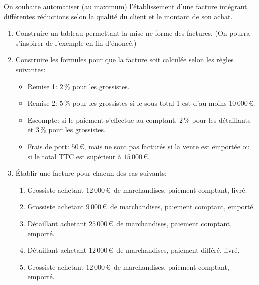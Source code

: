 \documentclass[a4paper, 9pt]{article}
\begin{document}
  \exost 
  On souhaite automatiser (au maximum) l'\'etablissement d'une facture int\'egrant diff\'erentes r\'eductions selon la qualit\'e du client et le montant de son achat.
  \begin{enumerate}
    \item Construire un tableau permettant la mise ne forme des factures. (On pourra s'inspirer de l'exemple en fin d'\'enonc\'e.)
    \item Construire les formules pour que la facture soit calcul\'ee selon les règles suivantes:
    \begin{itemize}
      \item Remise 1: $2$\,\% pour les grossistes.
      \item Remise 2: $5$\,\% pour les grossistes si le sous-total 1 est d'au moins $10\,000$\,\euro{}.
      \item Escompte: si le paiement s'effectue au comptant, $2$\,\% pour les d\'etaillants et $3$\,\% pour les grossistes.
      \item Frais de port: $50$\,\euro{}, mais ne sont pas factur\'es si la vente est emport\'ee ou si le total TTC est sup\'erieur à $15\,000$\,\euro{}.
    \end{itemize}
    \item Établir une facture pour chacun des cas suivants:
    \begin{enumerate}
      \item Grossiste achetant $12\,000$\,\euro{}\ de marchandises, paiement comptant, livr\'e.
      \item Grossiste achetant $9\,000$\,\euro{}\ de marchandises, paiement comptant, emport\'e.
      \item D\'etaillant achetant $25\,000$\,\euro{}\ de marchandises, paiement comptant, emport\'e.
      \item D\'etaillant achetant $12\,000$\,\euro{}\ de marchandises, paiement diff\'er\'e, livr\'e.
      \item Grossiste achetant $12\,000$\,\euro{}\ de marchandises, paiement comptant, emport\'e.
    \end{enumerate}
  \end{enumerate}
\end{document}
